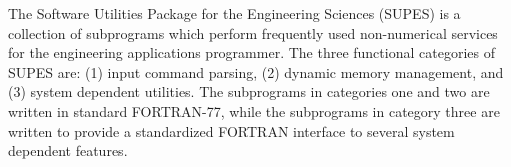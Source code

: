 The Software Utilities Package for the Engineering Sciences (SUPES) is a
collection of subprograms which perform frequently used non-numerical
services for the engineering applications programmer.  The three functional
categories of SUPES are: (1) input command parsing, (2) dynamic memory
management, and (3) system dependent utilities.  The subprograms in categories
one and two are written in standard FORTRAN-77, while the subprograms in
category three are written to provide a standardized FORTRAN interface to
several system dependent features. 
